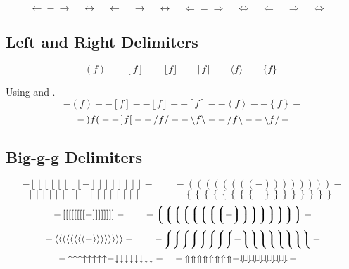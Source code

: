 \documentclass[12pt, a4paper, oneside]{article}
\theoremstyle{Plain}
\theoremstyle{Definition}
\theoremstyle{Remark}
\begin{document}
\begin{appendix}
\begin{displaymath}
  \leftarrow \mathrel{-} \rightarrow \quad
  \leftrightarrow \quad
  \longleftarrow  \quad
  \longrightarrow \quad
  \longleftrightarrow \quad
  \Leftarrow = \Rightarrow \quad
  \Leftrightarrow \quad
  \Longleftarrow  \quad
  \Longrightarrow \quad
  \Longleftrightarrow \quad
\end{displaymath}


\subsection{Left and Right Delimiters \showfamily}

\def\testdelim#1#2{ - #1 f #2 - }
\begin{displaymath}
  \testdelim()
  \testdelim[]
  \testdelim\lfloor\rfloor
  \testdelim\lceil\rceil
  \testdelim\langle\rangle
  \testdelim\{\}
\end{displaymath}

Using {\tt\string\left} and {\tt\string\right}.
\def\testdelim#1#2{ - \left#1 f \right#2 - }
\begin{displaymath}
  \testdelim()
  \testdelim[]
  \testdelim\lfloor\rfloor
  \testdelim\lceil\rceil
  \testdelim\langle\rangle
  \testdelim\{\}
\end{displaymath}
\begin{displaymath}
  \testdelim)(
  \testdelim][
  \testdelim//
  \testdelim\backslash\backslash
  \testdelim/\backslash
  \testdelim\backslash/
\end{displaymath}


\subsection{Big-g-g Delimiters \showfamily}

\def\testdelim#1#2{%
  - \left#1\left#1\left#1\left#1\left#1\left#1\left#1\left#1 -
  \right#2\right#2\right#2\right#2\right#2\right#2\right#2\right#2 -}

\begingroup
\delimitershortfall-1pt
\begin{displaymath}
  \testdelim\lfloor\rfloor
  \qquad
  \testdelim()
\end{displaymath}
\begin{displaymath}
  \testdelim\lceil\rceil
  \qquad
  \testdelim\{\}
\end{displaymath}
\begin{displaymath}
  \testdelim[]
  \qquad
  \testdelim\lgroup\rgroup
\end{displaymath}
\begin{displaymath}
  \testdelim\langle\rangle
  \qquad
  \testdelim\lmoustache\rmoustache
\end{displaymath}
\begin{displaymath}
  \testdelim\uparrow\downarrow \quad
  \testdelim\Uparrow\Downarrow \quad
\end{displaymath}
\endgroup %


\end{appendix}
\end{document}
